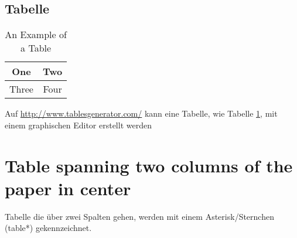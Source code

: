 \subsection{Tabelle}
%
\begin{table}[!ht]
\renewcommand{\arraystretch}{1.3}
\caption{An Example of a Table}
\label{table_example}
\centering
\begin{tabular}{|c|c|}
\hline
One & Two\\
\hline
Three & Four\\
\hline
\end{tabular}
\end{table}

Auf \url{http://www.tablesgenerator.com/} kann eine Tabelle, wie Tabelle \ref{table_example}, mit einem graphischen Editor erstellt werden


\section{Table spanning two columns of the paper in center}

Tabelle die über zwei Spalten gehen, werden mit einem Asterisk/Sternchen (table*) gekennzeichnet.

